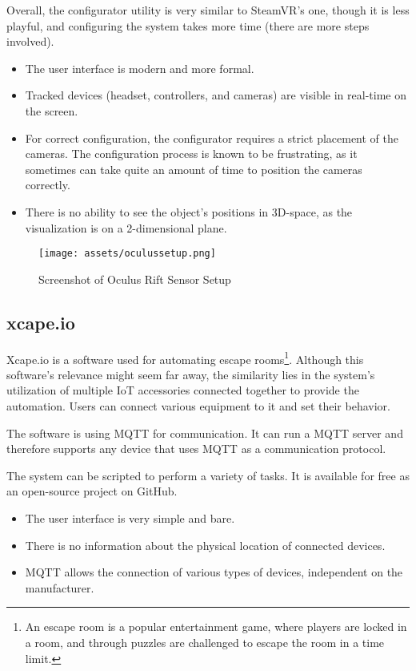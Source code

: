 Overall, the configurator utility is very similar to SteamVR’s one, though it
is less playful, and configuring the system takes more time (there are more steps
involved).

\pagebreak

\begin{itemize}
    \itemsep0em
\item The user interface is modern and more formal.
\item Tracked devices (headset, controllers, and cameras) are visible in real-time
on the screen.
\item For correct configuration, the configurator requires a strict placement
of the cameras. The configuration process is known to be frustrating,
as it sometimes can take quite an amount of time to position the cameras correctly.
\item There is no ability to see the object’s positions in 3D-space, as the visualization is
on a 2-dimensional plane.
\end{itemize}

\begin{figure}[h]{}
\centering\texttt{[image: assets/oculussetup.png]}
\caption{Screenshot of Oculus Rift Sensor Setup}
\end{figure}

\newpage

\hypertarget{x-xcape.io}{\subsection{xcape.io}}
Xcape.io is a software used for automating escape rooms\footnote{An escape room 
is a popular entertainment game, where players are locked in a room, and through 
puzzles are challenged to escape the room in a time limit.}.
Although this software’s relevance might seem far away,
the similarity lies in the system’s utilization of multiple IoT accessories
connected together to provide the automation. Users can connect various
equipment to it and set their behavior.

The software is using MQTT for communication. It can run a MQTT server and
therefore supports any device that uses MQTT as a communication protocol.

The system can be scripted to perform a variety of tasks. It is available
for free as an open-source project on GitHub.

\begin{itemize}
    \itemsep0em
\item The user interface is very simple and bare.
\item There is no information about the physical location of connected devices.
\item MQTT allows the connection of various types of devices, independent on the manufacturer.
\end{itemize}
